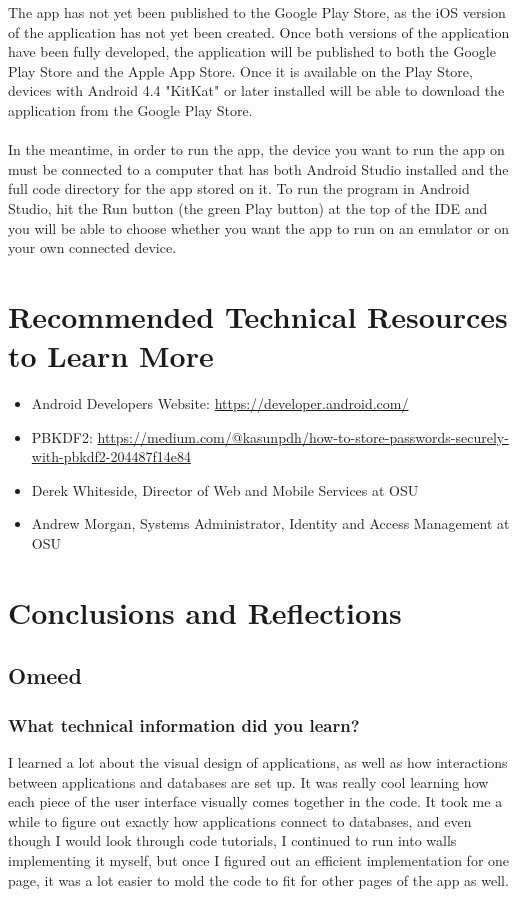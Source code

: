 \documentclass[onecolumn, draftclsnofoot,10pt, compsoc]{IEEEtran}
\begin{document}
  The app has not yet been published to the Google Play Store, as the iOS version of the application has not yet been created. Once both versions of the application have been fully developed, the application will be published to both the Google Play Store and the Apple App Store. Once it is available on the Play Store, devices with Android 4.4 "KitKat" or later installed will be able to download the application from the Google Play Store. \\ \\
  In the meantime, in order to run the app, the device you want to run the app on must be connected to a computer that has both Android Studio installed and the full code directory for the app stored on it. To run the program in Android Studio, hit the Run button (the green Play button) at the top of the IDE and you will be able to choose whether you want the app to run on an emulator or on your own connected device.

\section{Recommended Technical Resources to Learn More}
  \begin{itemize}
    \item Android Developers Website: \url{https://developer.android.com/}
    \item PBKDF2: \url{https://medium.com/@kasunpdh/how-to-store-passwords-securely-with-pbkdf2-204487f14e84}
    \item Derek Whiteside, Director of Web and Mobile Services at OSU
    \item Andrew Morgan, Systems Administrator, Identity and Access Management at OSU
  \end{itemize}
  \newpage

\section{Conclusions and Reflections}
  \subsection{Omeed}
    \subsubsection{What technical information did you learn?}
      I learned a lot about the visual design of applications, as well as how interactions between applications and databases are set up. It was really cool learning how each piece of the user interface visually comes together in the code. It took me a while to figure out exactly how applications connect to databases, and even though I would look through code tutorials, I continued to run into walls implementing it myself, but once I figured out an efficient implementation for one page, it was a lot easier to mold the code to fit for other pages of the app as well.
\end{document}

